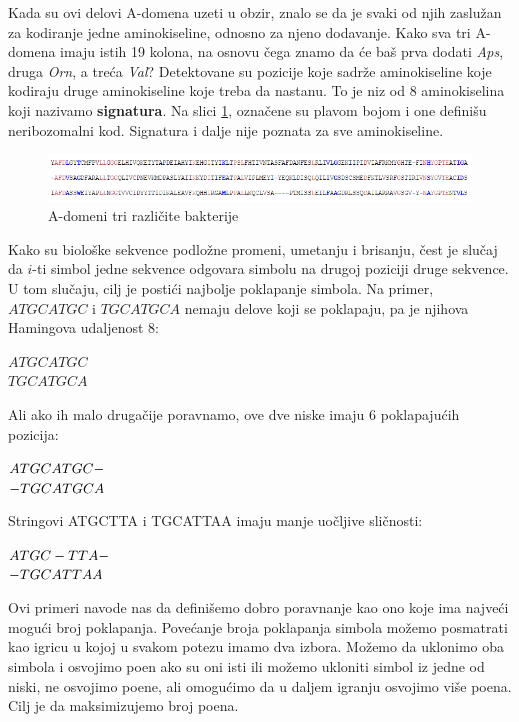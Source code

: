 Kada su ovi delovi A-domena uzeti u obzir, znalo se da je svaki od njih zaslužan za kodiranje jedne aminokiseline, odnosno za njeno dodavanje. Kako sva tri A-domena imaju istih 19 kolona, na osnovu čega znamo da će baš prva dodati \textit{Aps}, druga \textit{Orn}, a treća \textit{Val}? Detektovane su pozicije koje sadrže aminokiseline koje kodiraju druge aminokiseline koje treba da nastanu. To je niz od 8 aminokiselina koji nazivamo \textbf{signatura}. Na slici \ref{bakterije}, označene su plavom bojom i one definišu neribozomalni kod. Signatura i dalje nije poznata za sve aminokiseline.

\begin{figure}[H]
	\centering
	\includegraphics[width=1\textwidth]{poglavlja/5/slike/bakterije.png}
	\caption{A-domeni tri različite bakterije}
	\label{bakterije}
\end{figure}

Kako su biološke sekvence podložne promeni, umetanju i brisanju, čest je slučaj da $i$-ti simbol jedne sekvence odgovara simbolu na drugoj poziciji druge sekvence. U tom slučaju, cilj je postići najbolje poklapanje simbola.
Na primer, $ATGCATGC$ i $TGCATGCA$ nemaju delove koji se poklapaju, pa je njihova Hamingova udaljenost 8:

\begin{center}
$ATGCATGC$\\
$TGCATGCA$
\end{center}
    
Ali ako ih malo drugačije poravnamo, ove dve niske imaju 6 poklapajućih pozicija:

\begin{center}
$A\textcolor{black}{TGCATGC}-$\\
$-\textcolor{black}{TGCATGC}A$
\end{center}

Stringovi ATGCTTA i TGCATTAA imaju manje uočljive sličnosti:

\begin{center}
$A\textcolor{black}{TGC}-\textcolor{black}{TTA}-$\\
$-\textcolor{black}{TGC}A\textcolor{black}{TTA}A$
\end{center}

Ovi primeri navode nas da definišemo dobro poravnanje kao ono koje ima najveći mogući broj poklapanja. Povećanje broja poklapanja simbola možemo posmatrati kao igricu u kojoj u svakom potezu imamo dva izbora. Možemo da uklonimo oba simbola i osvojimo poen ako su oni isti ili možemo ukloniti simbol iz jedne od niski, ne osvojimo poene, ali omogućimo da u daljem igranju osvojimo više poena. Cilj je da maksimizujemo broj poena.



